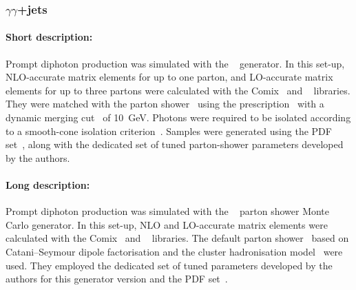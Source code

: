 

\subsubsection[yy+jets]{ $\gamma\gamma$+jets}

\paragraph{Short description:}

Prompt diphoton production was simulated with the
\SHERPA[2.2]~\cite{Bothmann:2019yzt} generator. In this set-up, NLO-accurate
matrix elements for up to one parton, and LO-accurate matrix elements for up
to three partons were calculated with the Comix~\cite{Gleisberg:2008fv} and
\OPENLOOPS~\cite{Buccioni:2019sur,Cascioli:2011va,Denner:2016kdg} libraries. They were matched
with the \SHERPA parton shower~\cite{Schumann:2007mg} using the \MEPSatNLO
prescription~\cite{Hoeche:2011fd,Hoeche:2012yf,Catani:2001cc,Hoeche:2009rj}
with a dynamic merging cut~\cite{Siegert:2016bre} of \SI{10}{\GeV}.
Photons were required to be isolated according to a smooth-cone isolation
criterion~\cite{Frixione:1998jh}. Samples were generated using the
\NNPDF[3.0nnlo] PDF set~\cite{Ball:2014uwa}, along with the dedicated set of tuned
parton-shower parameters developed by the \SHERPA authors.


\paragraph{Long description:}

Prompt diphoton production was simulated with the
\SHERPA[2.2]~\cite{Bothmann:2019yzt} parton shower Monte Carlo
generator. In this set-up, NLO and LO-accurate
matrix elements were calculated with the Comix~\cite{Gleisberg:2008fv} and
\OPENLOOPS~\cite{Buccioni:2019sur,Cascioli:2011va,Denner:2016kdg} libraries.
The default \SHERPA parton shower~\cite{Schumann:2007mg} based on
Catani--Seymour dipole factorisation and the cluster hadronisation model~\cite{Winter:2003tt}
were used. They employed the dedicated set of tuned parameters developed by the
\SHERPA authors for this generator version and the \NNPDF[3.0nnlo]
PDF set~\cite{Ball:2014uwa}.

